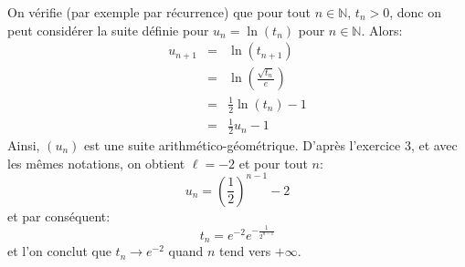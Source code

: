 On vérifie (par exemple par récurrence) que pour tout $n\in\mathbb{N}$, $t_n>0$, donc on peut considérer la suite définie pour $u_n=\ln(t_n)$ pour $n\in\mathbb{N}$. Alors:
\begin{eqnarray*}
  u_{n+1} &=& \ln(t_{n+1}) \\
  &=& \ln\left(\frac{\sqrt{t_{n}}}{e}\right) \\
  &=& \frac{1}{2}\ln(t_{n})-1 \\
  &=& \frac{1}{2}u_n-1
\end{eqnarray*}
Ainsi, $(u_n)$ est une suite arithmético-géométrique. D’après l’exercice 3, et avec les mêmes notations, on obtient $\ell = -2$ et pour tout $n$:
\[
u_n = \left(\frac{1}{2}\right)^{n-1}-2
\]
et par conséquent:
\[
t_n = e^{-2}e^{-\frac{1}{2^{n-1}}}
\]
et l'on conclut que $t_n\to e^{-2}$ quand $n$ tend vers $+\infty$.  
